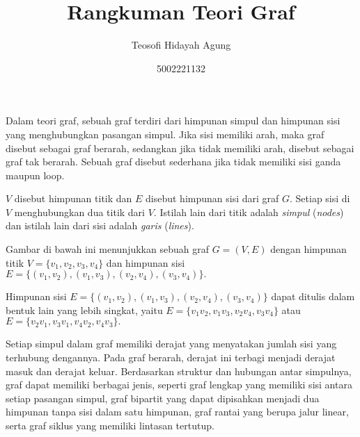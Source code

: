 \documentclass{article}
\begin{document}
\title{Rangkuman Teori Graf}
\author{Teosofi Hidayah Agung}
\date{5002221132}
\maketitle

Dalam teori graf, sebuah graf  terdiri dari himpunan simpul  dan himpunan sisi  yang menghubungkan pasangan simpul. Jika sisi memiliki arah, maka graf disebut sebagai graf berarah, sedangkan jika tidak memiliki arah, disebut sebagai graf tak berarah. Sebuah graf disebut sederhana jika tidak memiliki sisi ganda maupun loop.

$V$ disebut himpunan titik dan $E$ disebut himpunan sisi dari graf $G$. Setiap sisi di $V$ menghubungkan dua titik dari $V$. Istilah lain dari titik adalah \textit{simpul} (\textit{nodes}) dan istilah lain dari sisi adalah \textit{garis} (\textit{lines}).

Gambar di bawah ini menunjukkan sebuah graf $G = (V,E)$ dengan himpunan titik
$
V = \{ v_1, v_2, v_3, v_4 \}
$
dan himpunan sisi
$
E = \{ (v_1, v_2), (v_1, v_3), (v_2, v_4), (v_3, v_4) \}.
$

\begin{center}
\end{center}

Himpunan sisi
$
E = \{ (v_1, v_2), (v_1, v_3), (v_2, v_4), (v_3, v_4) \}
$
dapat ditulis dalam bentuk lain yang lebih singkat, yaitu
$  
E = \{ v_1 v_2, v_1 v_3, v_2 v_4, v_3 v_4 \}
$
atau
$
E = \{ v_2 v_1, v_3 v_1, v_4 v_2, v_4 v_3 \}.
$

Setiap simpul dalam graf memiliki derajat yang menyatakan jumlah sisi yang terhubung dengannya. Pada graf berarah, derajat ini terbagi menjadi derajat masuk dan derajat keluar. Berdasarkan struktur dan hubungan antar simpulnya, graf dapat memiliki berbagai jenis, seperti graf lengkap yang memiliki sisi antara setiap pasangan simpul, graf bipartit yang dapat dipisahkan menjadi dua himpunan tanpa sisi dalam satu himpunan, graf rantai yang berupa jalur linear, serta graf siklus yang memiliki lintasan tertutup.
\end{document}
